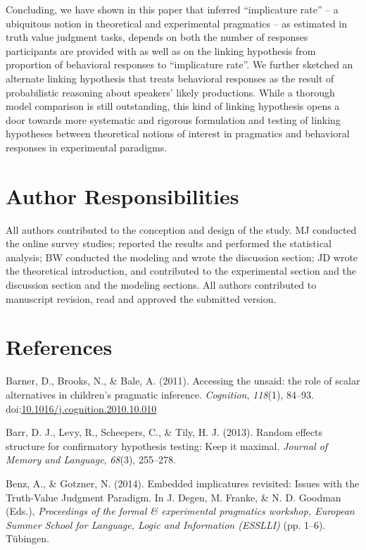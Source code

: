 \documentclass[man]{apa6}
\theoremstyle{definition}
\theoremstyle{definition}
\theoremstyle{definition}
\theoremstyle{remark}
\begin{document}
Concluding, we have shown in this paper that inferred
\enquote{implicature rate} -- a ubiquitous notion in theoretical and experimental
pragmatics -- as estimated in truth value judgment tasks, depends on
both the number of responses participants are provided with as well as
on the linking hypothesis from proportion of behavioral responses to
\enquote{implicature rate}. We further sketched an alternate linking
hypothesis that treats behavioral responses as the result of
probabilistic reasoning about speakers' likely productions. While a
thorough model comparison is still outstanding, this kind of linking
hypothesis opens a door towards more systematic and rigorous formulation
and testing of linking hypotheses between theoretical notions of
interest in pragmatics and behavioral responses in experimental
paradigms.


\section{Author Responsibilities}
All authors contributed to the conception and design of the study. MJ conducted the online survey studies; reported the results and performed the statistical analysis; BW conducted the modeling and wrote the discussion section; JD wrote the theoretical introduction, and contributed to the experimental section and the discussion section and the modeling sections. All authors contributed to manuscript revision, read and approved the submitted version.

\section{References}\label{references}

\setlength{\parindent}{-0.5in} \setlength{\leftskip}{0.5in}

\hypertarget{refs}{}
\hypertarget{ref-Barner2011}{}
Barner, D., Brooks, N., \& Bale, A. (2011). Accessing the unsaid: the
role of scalar alternatives in children's pragmatic inference.
\emph{Cognition}, \emph{118}(1), 84--93.
doi:\href{https://doi.org/10.1016/j.cognition.2010.10.010}{10.1016/j.cognition.2010.10.010}

\hypertarget{ref-barr2013random}{}
Barr, D. J., Levy, R., Scheepers, C., \& Tily, H. J. (2013). Random
effects structure for confirmatory hypothesis testing: Keep it maximal.
\emph{Journal of Memory and Language}, \emph{68}(3), 255--278.

\hypertarget{ref-BenzGotzner2014}{}
Benz, A., \& Gotzner, N. (2014). Embedded implicatures revisited: Issues
with the Truth-Value Judgment Paradigm. In J. Degen, M. Franke, \& N. D.
Goodman (Eds.), \emph{Proceedings of the formal \& experimental
pragmatics workshop, European Summer School for Language, Logic and
Information (ESSLLI)} (pp. 1--6). Tübingen.
\end{document}
